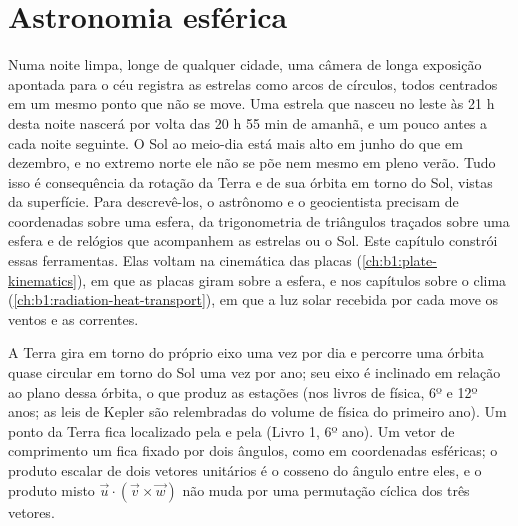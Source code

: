 \chapter{Astronomia esférica}\label{ch:b1:spherical-astronomy}

Numa noite limpa, longe de qualquer cidade, uma câmera de longa exposição apontada para o céu registra as estrelas como arcos de círculos, todos centrados em um mesmo ponto que não se move. Uma estrela que nasceu no leste às 21 h desta noite nascerá por volta das 20 h 55 min de amanhã, e um pouco antes a cada noite seguinte. O Sol ao meio-dia está mais alto em junho do que em dezembro, e no extremo norte ele não se põe nem mesmo em pleno verão. Tudo isso é consequência da rotação da Terra e de sua órbita em torno do Sol, vistas da superfície. Para descrevê-los, o astrônomo e o geocientista precisam de coordenadas sobre uma esfera, da trigonometria de triângulos traçados sobre uma esfera e de relógios que acompanhem as estrelas ou o Sol. Este capítulo constrói essas ferramentas. Elas voltam na cinemática das placas (\cref{ch:b1:plate-kinematics}), em que as placas giram sobre a esfera, e nos capítulos sobre o clima (\cref{ch:b1:radiation-heat-transport}), em que a luz solar recebida por cada  move os ventos e as correntes.

\begin{recall}
A Terra gira em torno do próprio eixo uma vez por dia e percorre uma órbita quase circular em torno do Sol uma vez por ano; seu eixo é inclinado em relação ao plano dessa órbita, o que produz as estações (nos livros de física, 6º e 12º anos; as leis de Kepler são relembradas do volume de física do primeiro ano). Um ponto da Terra fica localizado pela  e pela  (Livro 1, 6º ano). Um vetor de comprimento um fica fixado por dois ângulos, como em coordenadas esféricas; o produto escalar de dois vetores unitários é o cosseno do ângulo entre eles, e o produto misto $\vec u\cdot(\vec v\times\vec w)$ não muda por uma permutação cíclica dos três vetores.
\end{recall}

